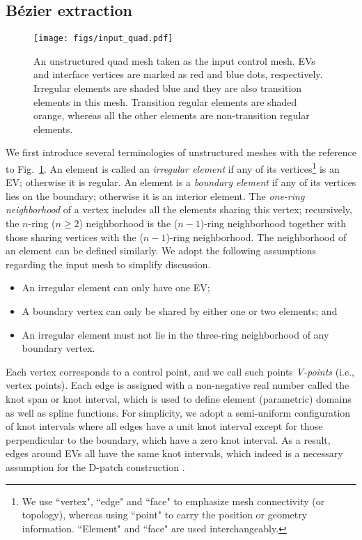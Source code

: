 \documentclass[graybox]{svmult}
\begin{document}
\subsection{B\'{e}zier extraction}
\label{sec:bezier_ext}

\begin{figure}[htb]
\centering
\texttt{[image: figs/input\_quad.pdf]}
\caption{An unstructured quad mesh taken as the input control mesh. EVs and interface vertices are marked as red and blue dots, respectively. Irregular elements are shaded blue and they are also transition elements in this mesh. Transition regular elements are shaded orange, whereas all the other elements are non-transition regular elements.}
\label{fig:unstruct_mesh}
\end{figure}

We first introduce several terminologies of unstructured meshes with the reference to Fig.~\ref{fig:unstruct_mesh}. An element is called an \emph{irregular element} if any of its vertices\footnote{We use ``vertex", ``edge" and ``face" to emphasize mesh connectivity (or topology), whereas using ``point" to carry the position or geometry information. ``Element" and ``face" are used interchangeably.} is an EV; otherwise it is regular. An element is a \emph{boundary element} if any of its vertices lies on the boundary; otherwise it is an interior element. The \emph{one-ring neighborhood} of a vertex includes all the elements sharing this vertex; recursively, the $n$-ring ($n\geq 2$) neighborhood is the ($n-1$)-ring neighborhood together with those sharing vertices with the ($n-1$)-ring neighborhood. The neighborhood of an element can be defined similarly. We adopt the following assumptions regarding the input mesh to simplify discussion.

\begin{itemize}
\item An irregular element can only have one EV;
\item A boundary vertex can only be shared by either one or two elements; and
\item An irregular element must not lie in the three-ring neighborhood of any boundary vertex.
\end{itemize}

Each vertex corresponds to a control point, and we call such points \emph{V-points} (i.e., vertex points).
Each edge is assigned with a non-negative real number called the knot span or knot interval, which is used to define element (parametric) domains as well as spline functions. For simplicity, we adopt a semi-uniform configuration of knot intervals where all edges have a unit knot interval except for those perpendicular to the boundary, which have a zero knot interval. As a result, edges around EVs all have the same knot intervals, which indeed is a necessary assumption for the D-patch construction \cite{ref:reif97}.
\end{document}
